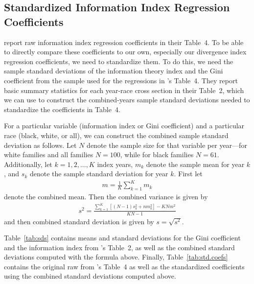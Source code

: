 \documentclass[12pt]{article}
\begin{document}
\clearpage

\subsection{Standardized Information Index Regression Coefficients}
\citet{reardon2011income} report raw information index regression coefficients in their Table~4. To be able to directly compare these coefficients to our own, especially our divergence index regression coefficients, we need to standardize them. To do this, we need the sample standard deviations of the information theory index and the Gini coefficient from the sample used for the regressions in \citet{reardon2011income}'s Table~4. They report basic summary statistics for each year-race cross section in their Table~2, which we can use to construct the combined-years sample standard deviations needed to standardize the coefficients in Table~4.

For a particular variable (information index or Gini coefficient) and a particular race (black, white, or all), we can construct the combined sample standard deviation as follows. Let $N$ denote the sample size for that variable per year---for white families and all families $N=100$, while for black families $N=61$. Additionally, let $k=1,2,...,K$ index years, $m_k$ denote the sample mean for year $k$, and $s_k$ denote the sample standard deviation for year $k$. First let
\begin{align*}
m = \frac{1}{K}\sum_{k=1}^Km_k
\end{align*}
denote the combined mean. Then the combined variance is given by
\begin{align*}
s^2= \frac{\sum_{k=1}^K\left[(N-1)s_k^2 + nm_k^2\right] - KNm^2}{KN - 1}
\end{align*}
and then combined standard deviation is given by $s = \sqrt{s^2}$.

Table~\ref{tab:sds} contains means and standard deviations for the Gini coefficient and the information index from \citet{reardon2011income}'s Table~2, as well as the combined standard deviations computed with the formula above.
Finally, Table~\ref{tab:std.coefs} contains the original raw from \citet{reardon2011income}'s Table~4 as well as the standardized coefficients using the combined standard deviations computed above.
\end{document}
